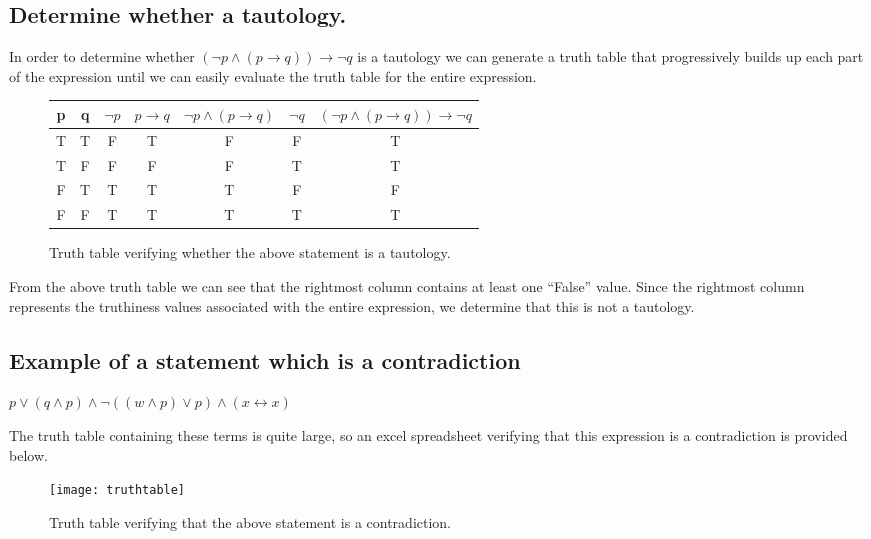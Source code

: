 \subsection{Determine whether a tautology.}
In order to determine whether $(\lnot p \wedge (p \rightarrow q)) \rightarrow \lnot q$ is a tautology we can generate a truth table that progressively builds up each part of the expression until we can easily evaluate the truth table for the entire expression.


\begin{figure}[ht]
\begin{center}
\begin{tabular}{|c|c|c|c|c|c|c|}
    \hline
    p & q & $\lnot p$ & $p \rightarrow q$ & $\lnot p \wedge (p \rightarrow q)$ & $\lnot q$ & $(\lnot p \wedge (p \rightarrow q)) \rightarrow \lnot q$ \\
    \hline
    T & T & F & T & F & F & T \\
    \hline
    T & F & F & F & F & T & T \\
    \hline
    F & T & T & T & T & F & F \\
    \hline
    F & F & T & T & T & T & T \\
    \hline
\end{tabular}
\end{center}
\caption{Truth table verifying whether the above statement is a tautology.}
\end{figure}

From the above truth table we can see that the rightmost column contains at least one ``False'' value. Since the rightmost column represents the truthiness values associated with the entire expression, we determine that this is not a tautology.

\newpage
\subsection{Example of a statement which is a contradiction}
\begin{center}
$p \lor (q \wedge p) \wedge \lnot ((w \wedge p) \lor p) \wedge (x \leftrightarrow x)$
\end{center}

The truth table containing these terms is quite large, so an excel spreadsheet verifying that this expression is a contradiction is provided below.


\begin{figure}[ht]
\begin{center}
\texttt{[image: truthtable]}
\end{center}
\caption{Truth table verifying that the above statement is a contradiction.}
\end{figure}
